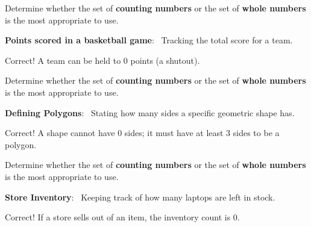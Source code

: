 \documentclass{ximera}[font=12pt]  %
\begin{document}
\begin{problem}
    Determine whether the set of \textbf{counting numbers} or the set of \textbf{whole numbers} is the most appropriate to use.

    \begin{center}
        \textbf{Points scored in a basketball game}: \ Tracking the total score for a team.
    \end{center}

\begin{multipleChoice}
\end{multipleChoice}
\begin{feedback}
    Correct! A team can be held to 0 points (a shutout).
\end{feedback}
\end{problem}

\begin{problem}
    Determine whether the set of \textbf{counting numbers} or the set of \textbf{whole numbers} is the most appropriate to use.

    \begin{center}
            \textbf{Defining Polygons}: \ Stating how many sides a specific geometric shape has.
    \end{center}

\begin{multipleChoice}
\end{multipleChoice}
\begin{feedback}
    Correct! A shape cannot have 0 sides; it must have at least 3 sides to be a polygon.
\end{feedback}
\end{problem}

\begin{problem}
    Determine whether the set of \textbf{counting numbers} or the set of \textbf{whole numbers} is the most appropriate to use.

    \begin{center}
        \textbf{Store Inventory}: \ Keeping track of how many laptops are left in stock.
    \end{center}

\begin{multipleChoice}
\end{multipleChoice}
\begin{feedback}
    Correct! If a store sells out of an item, the inventory count is 0.
\end{feedback}

\end{problem}
\end{document}
